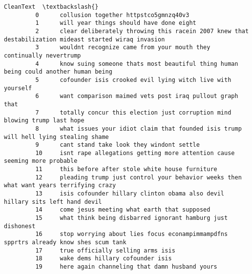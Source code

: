 \documentclass[11pt]{article}
\begin{document}
\begin{Verbatim}[commandchars=\\\{\}]
                                                                                                                CleanText  \textbackslash{}
         0      collusion together httpstco5gmnzq40v3                                                                       
         1      will year things should have done eight                                                                     
         2      clear deliberately throwing this racein 2007 knew that destabilization mideast started wiraq invasion       
         3      wouldnt recognize came from your mouth they continually nevertrump                                          
         4      know suing someone thats most beautiful thing human being could another human being                         
         5      cofounder isis crooked evil lying witch live with yourself                                                  
         6      want comparison maimed vets post iraq pullout graph that                                                    
         7      totally concur this election just corruption mind blowing trump last hope                                   
         8      what issues your idiot claim that founded isis trump will hell lying stealing shame                         
         9      cant stand take look they windont settle                                                                    
         10     isnt rape allegations getting more attention cause seeming more probable                                    
         11     this before after stole white house furniture                                                               
         12     pleading trump just control your behavior weeks then what want years terrifying crazy                       
         13     isis cofounder hillary clinton obama also devil hillary sits left hand devil                                
         14     come jesus meeting what earth that supposed                                                                 
         15     what think being disbarred ignorant hamburg just dishonest                                                  
         16     stop worrying about lies focus econampimmampdfns spprtrs already know shes scum tank                        
         17     true officially selling arms isis                                                                           
         18     wake dems hillary cofounder isis                                                                            
         19     here again channeling that damn husband yours                                                               

\end{Verbatim}
\end{document}
